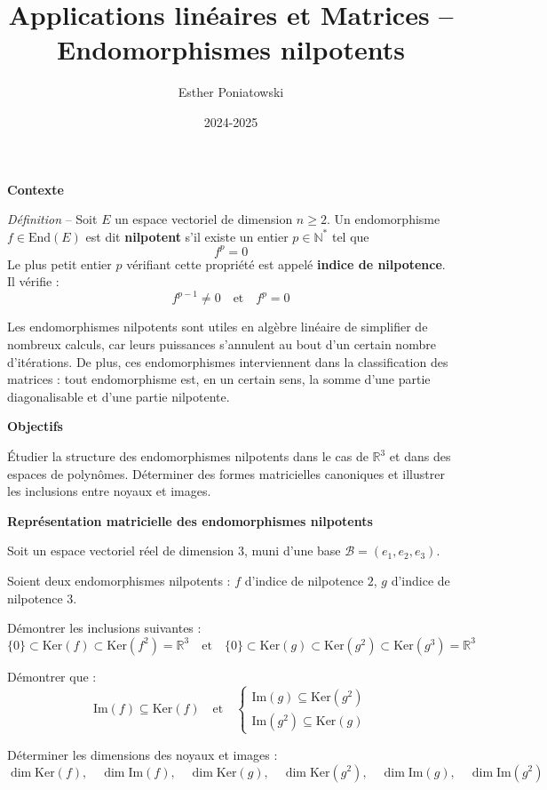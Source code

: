 \documentclass[10pt,a4paper]{article}
\title{Applications linéaires et Matrices -- Endomorphismes nilpotents}
\author{Esther Poniatowski}
\date{2024-2025}
\begin{document}
\textbf{Contexte}

\textit{Définition} -- Soit $E$ un espace vectoriel de dimension $n \geq 2$. Un endomorphisme $f \in
\mathrm{End}(E)$ est dit \textbf{nilpotent} s'il existe un entier $p \in \mathbb{N}^*$ tel que
\[
f^p = 0
\]
Le plus petit entier $p$ vérifiant cette propriété est appelé \textbf{indice de nilpotence}. Il
vérifie :
\[
f^{p-1} \neq 0 \quad \text{et} \quad f^p = 0
\]

Les endomorphismes nilpotents sont utiles en algèbre linéaire de simplifier de nombreux calculs, car leurs puissances s'annulent au
bout d'un certain nombre d'itérations. De plus, ces endomorphismes interviennent dans la classification des matrices : tout endomorphisme
est, en un certain sens, la somme d'une partie diagonalisable et d'une partie nilpotente.


\bigskip
\textbf{Objectifs}

Étudier la structure des endomorphismes nilpotents dans le cas de $\mathbb{R}^3$ et dans des espaces
de polynômes. Déterminer des formes matricielles canoniques et illustrer les inclusions entre noyaux
et images.

\bigskip
\textbf{Représentation matricielle des endomorphismes nilpotents}

Soit un espace vectoriel réel de dimension 3, muni d'une base $\mathscr{B} = (e_1, e_2,
e_3)$.

Soient deux endomorphismes nilpotents : $f$ d'indice de nilpotence $2$, $g$ d'indice de nilpotence
$3$.

\q Démontrer les inclusions suivantes :
\[
\{0\} \subset \mathrm{Ker}(f) \subset \mathrm{Ker}(f^2) = \mathbb{R}^3
\quad \text{et} \quad
\{0\} \subset \mathrm{Ker}(g) \subset \mathrm{Ker}(g^2) \subset \mathrm{Ker}(g^3) = \mathbb{R}^3
\]

\q Démontrer que :
\[
\mathrm{Im}(f) \subseteq \mathrm{Ker}(f)
\quad \text{et} \quad
\begin{cases}
\mathrm{Im}(g) \subseteq \mathrm{Ker}(g^2)\\
\mathrm{Im}(g^2) \subseteq \mathrm{Ker}(g)
\end{cases}
\]

\q Déterminer les dimensions des noyaux et images :
\[
\dim \mathrm{Ker}(f), \quad \dim \mathrm{Im}(f), \quad
\dim \mathrm{Ker}(g), \quad \dim \mathrm{Ker}(g^2), \quad
\dim \mathrm{Im}(g), \quad \dim \mathrm{Im}(g^2)
\]
\end{document}
